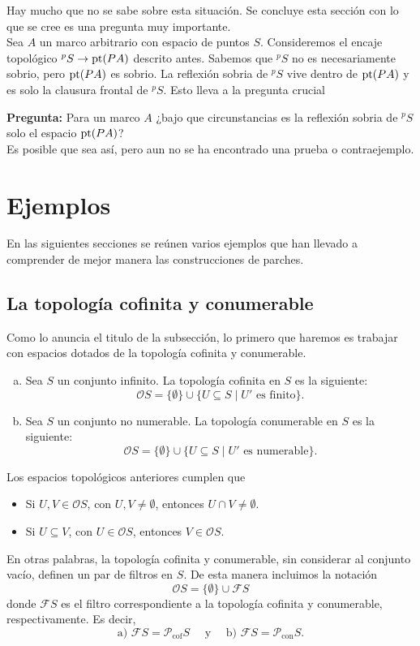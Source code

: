 Hay mucho que no se sabe sobre esta situación. Se concluye esta sección con lo que se cree es una pregunta muy importante.\\

Sea $A$ un marco arbitrario con espacio de puntos $S$. Consideremos el encaje topológico $^pS\to \mathrm{pt}(PA)$ descrito antes. Sabemos que $^pS$ no es necesariamente sobrio, pero $\mathrm{pt}(PA)$ es sobrio. La reflexión sobria de $^pS$ vive dentro de $\mathrm{pt}(PA)$ y es solo la clausura frontal de $^pS$. Esto lleva a la pregunta crucial

\textbf{Pregunta:} Para un marco $A$ ¿bajo que circunstancias es la reflexión sobria de $^pS$ solo el espacio $\mathrm{pt}(PA)$?\\

Es posible que sea así, pero aun no se ha encontrado una prueba o contraejemplo.

\section{Ejemplos}

En las siguientes secciones se reúnen varios ejemplos que han llevado a comprender de mejor manera las construcciones de parches. 

\subsection{La topología cofinita y conumerable}

Como lo anuncia el titulo de la subsección, lo primero que haremos es trabajar con espacios dotados de la topología cofinita y conumerable.

\begin{dfn}\label{Coficonu}
    \begin{enumerate}[a)]
        \item Sea $S$ un conjunto infinito. La topología cofinita en $S$ es la siguiente:
        \[
        \mathcal{O}S=\{\emptyset\}\cup\{U\subseteq S\mid U' \mbox{ es finito}\}.
        \]
        \item Sea $S$ un conjunto no numerable. La topología conumerable en $S$ es la siguiente:
        \[
        \mathcal{O}S=\{\emptyset\}\cup\{U\subseteq S\mid U' \mbox{ es numerable}\}.
        \]
    \end{enumerate}
\end{dfn}

Los espacios topológicos anteriores cumplen que
\begin{itemize}
    \item Si $U, V\in \mathcal{O}S$, con $U, V\neq \emptyset$, entonces $U\cap V\neq \emptyset$.
    \item Si $U\subseteq V$, con $U\in \mathcal{O}S$, entonces $V\in \mathcal{O}S$.
\end{itemize}
En otras palabras, la topología cofinita y conumerable, sin considerar al conjunto vacío, definen un par de filtros en $S$. De esta manera incluimos la notación
\[
\mathcal{O}S=\{\emptyset\}\cup \mathcal{F}S
\]
donde $\mathcal{F}S$ es el filtro correspondiente a la topología cofinita y conumerable, respectivamente. Es decir,
\[
\mbox{a) }\mathcal{F}S=\mathcal{P}_{\mbox{cof}}S\quad\mbox{ y }\quad\mbox{b) }\mathcal{F}S=\mathcal{P}_{\mbox{con}}S.
\]

